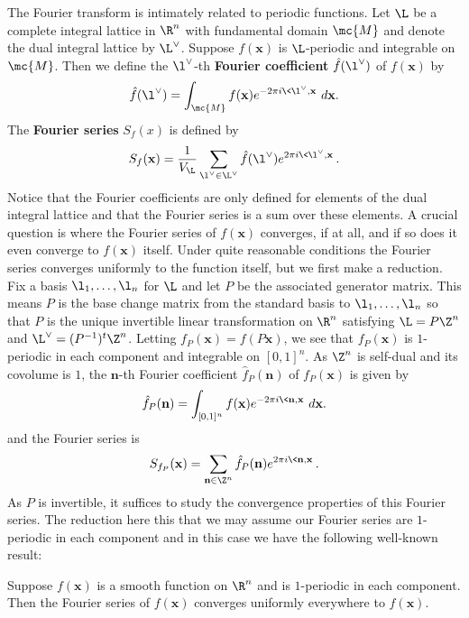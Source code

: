 \documentclass[12pt]{article}
\begin{document}
    The Fourier transform is intimately related to periodic functions. Let \(\L\) be a complete integral lattice in \(\R^{n}\) with fundamental domain \(\mc{M}\) and denote the dual integral lattice by \(\L^{\vee}\). Suppose \(f(\mathbf{x})\) is \(\L\)-periodic and integrable on \(\mc{M}\). Then we define the \(\l^{\vee}\)-th \textbf{Fourier coefficient} \(\hat{f}(\l^{\vee})\) of \(f(\mathbf{x})\) by
    \[
      \hat{f}(\l^{\vee}) = \int_{\mc{M}}f(\mathbf{x})e^{-2\pi i\<\l^{\vee},\mathbf{x}\>}\,d\mathbf{x}.
    \]
    The \textbf{Fourier series} \(S_{f}(x)\) is defined by
    \[
      S_{f}(\mathbf{x}) = \frac{1}{V_{\L}}\sum_{\l^{\vee} \in \L^{\vee}}\hat{f}(\l^{\vee})e^{2\pi i\<\l^{\vee},\mathbf{x}\>}.
    \]
    Notice that the Fourier coefficients are only defined for elements of the dual integral lattice and that the Fourier series is a sum over these elements. A crucial question is where the Fourier series of \(f(\mathbf{x})\) converges, if at all, and if so does it even converge to \(f(\mathbf{x})\) itself. Under quite reasonable conditions the Fourier series converges uniformly to the function itself, but we first make a reduction. Fix a basis \(\l_{1},\ldots,\l_{n}\) for \(\L\) and let \(P\) be the associated generator matrix. This means \(P\) is the base change matrix from the standard basis to \(\l_{1},\ldots,\l_{n}\) so that \(P\) is the unique invertible linear transformation on \(\R^{n}\) satisfying \(\L = P\Z^{n}\) and \(\L^{\vee} = (P^{-1})^{t}\Z^{n}\). Letting \( f_{P}(\mathbf{x}) = f(P\mathbf{x})\), we see that \(f_{P}(\mathbf{x})\) is \(1\)-periodic in each component and integrable on \([0,1]^{n}\). As \(\Z^{n}\) is self-dual and its covolume is \(1\), the \(\mathbf{n}\)-th Fourier coefficient \(\hat{f}_{P}(\mathbf{n})\) of \(f_{P}(\mathbf{x})\) is given by
    \[
      \hat{f}_{P}(\mathbf{n}) = \int_{[0,1]^{n}}f(\mathbf{x})e^{-2\pi i\<\mathbf{n},\mathbf{x}\>}\,d\mathbf{x}.
    \]
    and the Fourier series is
    \[
      S_{f_{P}}(\mathbf{x}) = \sum_{\mathbf{n} \in \Z^{n}}\hat{f}_{P}(\mathbf{n})e^{2\pi i\<\mathbf{n},\mathbf{x}\>}.
    \]
    As \(P\) is invertible, it suffices to study the convergence properties of this Fourier series. The reduction here this that we may assume our Fourier series are \(1\)-periodic in each component and in this case we have the following well-known result:

    \begin{theorem}
      Suppose \(f(\mathbf{x})\) is a smooth function on \(\R^{n}\) and is \(1\)-periodic in each component. Then the Fourier series of \(f(\mathbf{x})\) converges uniformly everywhere to \(f(\mathbf{x})\).
    \end{theorem}
\end{document}
